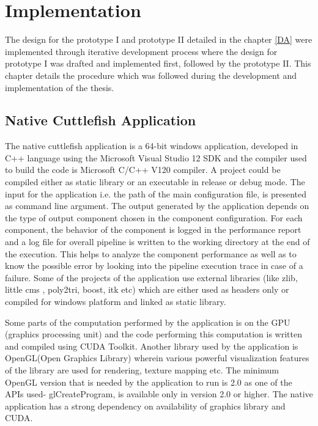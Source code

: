 \chapter{Implementation}

The design for the prototype I and prototype II detailed in the chapter \ref{DA} were implemented through iterative development process where the design for prototype I was drafted and implemented first, followed by the prototype II. This chapter details the procedure which was followed during the development and implementation of the thesis.  

\section{Native Cuttlefish Application} 
The native cuttlefish application is a 64-bit windows application, developed in C++ language using the Microsoft Visual Studio 12 SDK and the compiler used to build the code is Microsoft C/C++ V120 compiler. A project could be compiled either as static library or an executable in release or debug mode. The input for the application i.e. the path of the main configuration file, is presented as command line argument. The output generated by the application depends on the type of output component chosen in the component configuration. For each component, the behavior of the component is logged in the performance report and a log file for overall pipeline is written to the working directory at the end of the execution. This helps to analyze the component performance as well as to know the possible error by looking into the pipeline execution trace in case of a failure. Some of the projects of the application use external libraries (like zlib, little cms , poly2tri, boost, itk etc) which are either used as headers only or compiled for windows platform and linked as static library. 

Some parts of the computation performed by the application is on the GPU (graphics processing unit) and the code performing this computation is written and compiled using CUDA Toolkit. Another library used by the application is OpenGL(Open Graphics Library) wherein various powerful visualization features of the library are used for rendering, texture mapping etc. The minimum OpenGL version that is needed by the application to run is 2.0 as one of the APIs used- glCreateProgram, is available only in version 2.0 or higher. The native application has a strong dependency on availability of graphics library and CUDA.     

